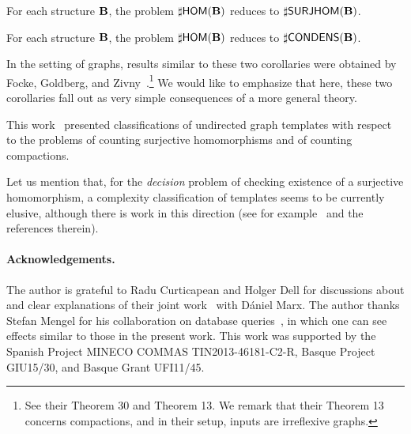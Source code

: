 \documentclass[11pt]{article}
\begin{document}
\begin{corollary}
For each structure $\mathbf{B}$,
the problem $\sharp\mathsf{HOM}(\mathbf{B})$ reduces to $\sharp\mathsf{SURJHOM}(\mathbf{B})$.
\end{corollary}

\begin{corollary}
For each structure $\mathbf{B}$,
the problem $\sharp\mathsf{HOM}(\mathbf{B})$ reduces to $\sharp\mathsf{CONDENS}(\mathbf{B})$.
\end{corollary}

In the setting of graphs, results similar to these two corollaries
were obtained by Focke, Goldberg, and Zivny~\cite{FockeGoldbergZivny17-counting-surjhoms-and-compactions}.\footnote{
See their Theorem 30 and Theorem 13.
We remark that their Theorem 13 concerns compactions,
and in their setup, inputs are irreflexive graphs.}
We would like to emphasize that here,
these two corollaries fall out as very simple consequences
of a more general theory.

This work~\cite{FockeGoldbergZivny17-counting-surjhoms-and-compactions}
presented classifications of undirected graph templates
with respect to the problems of counting surjective homomorphisms
and of counting compactions.



Let us mention that,
for the \emph{decision} problem of checking
existence of a surjective homomorphism,
a complexity classification of templates seems to be currently elusive,
although there is work in this direction
(see for example~\cite{Chen14-hardness-surjective-csp,LaroseMartinPaulusma2017-surjectivehom-reflexive-digraphs} and the references therein).

\paragraph{Acknowledgements.} 
The author is grateful to Radu Curticapean and Holger Dell
for 
discussions about
and clear explanations of their joint work~\cite{CurticapeanDellMarx17-homomorphisms-good-basis} with
D\'aniel Marx.
The author thanks Stefan Mengel for his collaboration
on database queries~\cite{ChenMengel14-pp-arxiv,ChenMengel15-pp-icdt,ChenMengel16-pods-ep-counting,ChenMengel17-lics-logic-counting}, in which one can see
effects similar to those in the present work.
This work was supported by the
Spanish Project MINECO COMMAS TIN2013-46181-C2-R, Basque Project GIU15/30, and Basque Grant UFI11/45.


%


\end{document}
